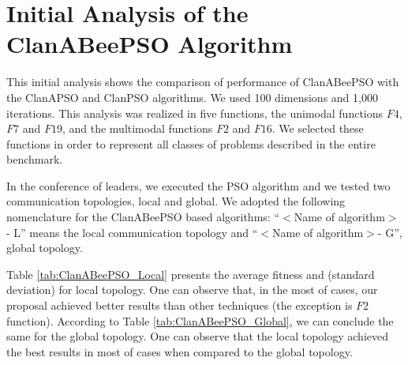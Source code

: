 
\section{Initial Analysis of the ClanABeePSO Algorithm}
This initial analysis shows the comparison of performance of ClanABeePSO with the ClanAPSO and ClanPSO algorithms. We used 100 dimensions and 1,000 iterations. This analysis was realized in five functions, the unimodal functions $F4$, $F7$ and $F19$, and the multimodal functions $F2$ and $F16$. We selected these functions in order to represent all classes of problems described in the entire benchmark.

In the conference of leaders, we executed the PSO algorithm and we tested two communication topologies, local and global. We adopted the following nomenclature for the ClanABeePSO based algorithms: ``$<$Name of algorithm$>$ - L'' means the local communication topology  and ``$<$Name of algorithm$>$- G'', global topology.

Table \ref{tab:ClanABeePSO_Local} presents the average fitness and (standard deviation) for local topology. One can observe that, in the most of cases, our proposal achieved better results than other techniques (the exception is $F2$ function). According to Table \ref{tab:ClanABeePSO_Global}, we can conclude the same for the global topology. One can observe that the local topology achieved the best results in most of cases when compared to the global topology. %


